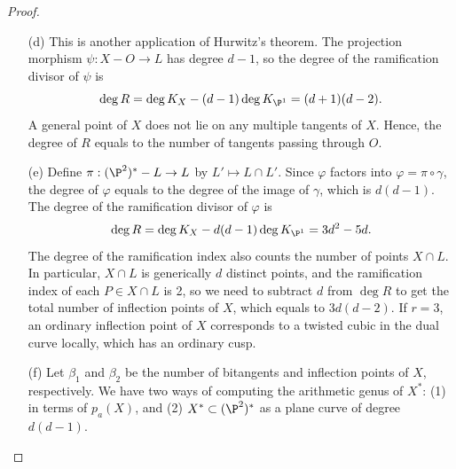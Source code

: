 \documentclass[a4paper]{article}
\begin{document}
\begin{enumerate} [label=\textbf{\arabic*.}, leftmargin=0em]
\begin{proof}
\begin{itemize} [leftmargin=0cm]
                  The genus of $X$ is related to $d$ by the degree genus formula.
                  Since $\psi$ has degree $d$ as a morphism of curves, Hurwitz's theorem can be used to compute the degree of the ramification divisor
                  \begin{equation*}
                    \deg{R} = \deg{K_X} - d \deg{K_{\P^1}} = d(d - 1).
                  \end{equation*}
                  The ramification index of each ramification point is 2, so the degree of $R$ equals to the number of tangents passing through $O$.

            \item[(d)] This is another application of Hurwitz's theorem.
                  The projection morphism $\psi : X - O \to L$ has degree $d - 1$, so the degree of the ramification divisor of $\psi$ is
                  \begin{equation*}
                    \deg{R} = \deg K_X - (d - 1) \deg{K_{\P^1}} = (d + 1)(d - 2).
                  \end{equation*}
                  A general point of $X$ does not lie on any multiple tangents of $X$.
                  Hence, the degree of $R$ equals to the number of tangents passing through $O$.

            \item[(e)] Define $\pi : (\P^2)^* - L \to L$ by $L' \mapsto L \cap L'$.
                  Since $\varphi$ factors into $\varphi = \pi \circ \gamma$, the degree of $\varphi$ equals to the degree of the image of $\gamma$, which is $d(d - 1)$.
                  The degree of the ramification divisor of $\varphi$ is
                  \begin{equation*}
                    \deg{R} = \deg K_X - d(d - 1) \deg{K_{\P^1}} = 3d^2 - 5d.
                  \end{equation*}
                  The degree of the ramification index also counts the number of points $X \cap L$.
                  In particular, $X \cap L$ is generically $d$ distinct points, and the ramification index of each $P \in X \cap L$ is 2, so we need to subtract $d$ from $\deg{R}$ to get the total number of inflection points of $X$, which equals to $3d(d - 2)$.
                  If $r = 3$, an ordinary inflection point of $X$ corresponds to a twisted cubic in the dual curve locally, which has an ordinary cusp.

            \item[(f)] Let $\beta_1$ and $\beta_2$ be the number of bitangents and inflection points of $X$, respectively.
                  We have two ways of computing the arithmetic genus of $X^*$: (1) in terms of $p_a(X)$, and (2) $X^* \subset (\P^2)^*$ as a plane curve of degree $d(d - 1)$.


\end{itemize}
\end{proof}
\end{enumerate}
\end{document}
